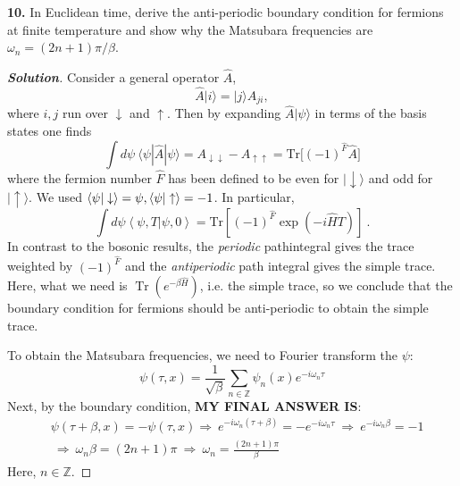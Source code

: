 \documentclass[11pt]{article}
\newenvironment{solution}[1][]{\begin{proof}[\textbf{Solution}]}{\end{proof}}
\begin{document}
\begin{tcolorbox}[problem]
\textbf{10.} In Euclidean time, derive the anti-periodic boundary condition for fermions at finite temperature and show why the Matsubara frequencies are $\omega_n=(2n+1)\pi/\beta$.
\end{tcolorbox}
\begin{solution}[12.10]
	Consider a general operator $\hat{A}$,
	$$\hat A|i\rangle=|j\rangle A_{ji},$$
	where $i,j$ run over $\downarrow$ and $\uparrow$. Then by expanding $\hat{A}|\psi\rangle$ in terms of the basis states one finds
	$$\int d\psi\:\langle\psi|\hat{A}|\psi\rangle=A_{\downarrow\downarrow}-A_{\uparrow\uparrow}=\mathrm{Tr}\Big[(-1)^{\hat{F}}\hat{A}\Big]$$
	where the fermion number $\hat{F}$ has been defined to be even for $|\downarrow\rangle$ and odd
	for $|\uparrow\rangle$. We used $\braket{\psi|\downarrow}=\psi,\braket{\psi|\uparrow}=-1$. In particular,
	$$\int d\psi\left\langle\psi,T|\psi,0\right\rangle=\mathrm{Tr}\left[(-1)^{\hat{F}}\exp(-i\hat{H}T)\right]\:.$$
	In contrast to the bosonic results, the \textit{periodic} pathintegral gives the trace weighted by $(-1)^{\hat{F}}$ and the \textit{antiperiodic} path integral gives the simple trace. Here, what we need is $\operatorname{Tr}(e^{-\beta \hat H})$, i.e. the simple trace, so we conclude that the boundary condition for fermions should be anti-periodic to obtain the simple trace.
	
	To obtain the Matsubara frequencies, we need to Fourier transform the $\psi$:
	$$
			\psi(\tau,x)=\frac1{\sqrt{\beta}}\sum_{n\in\mathbb Z}\psi_n(x)e^{-i\omega_n\tau}
	$$
	Next, by the boundary condition, \textbf{MY FINAL ANSWER IS}:
	$$
	\begin{aligned}
	&\psi(\tau+\beta,x)=-\psi(\tau,x)
		\Longrightarrow\ e^{-i\omega_n(\tau+\beta)}=-e^{-i\omega_n\tau}
		\ \Longrightarrow\ e^{-i\omega_n\beta}=-1\\&
		\ \Longrightarrow\ \omega_n\beta=(2n+1)\pi
		\ \Longrightarrow\ \omega_n=\boxed{\frac{(2n+1)\pi}{\beta}}
	\end{aligned}
	$$
	Here, $n\in\mathbb Z$.
\end{solution}
\end{document}
